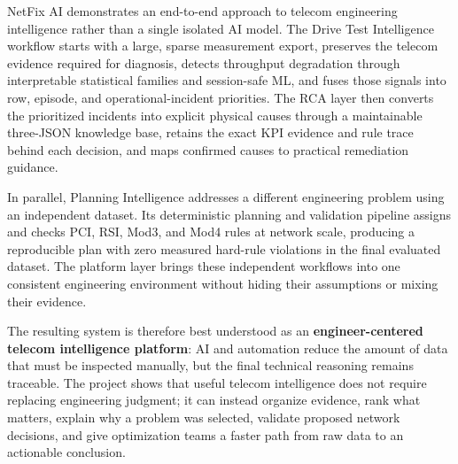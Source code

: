NetFix AI demonstrates an end-to-end approach to telecom engineering intelligence rather than a single isolated AI model. The Drive Test Intelligence workflow starts with a large, sparse measurement export, preserves the telecom evidence required for diagnosis, detects throughput degradation through interpretable statistical families and session-safe ML, and fuses those signals into row, episode, and operational-incident priorities. The RCA layer then converts the prioritized incidents into explicit physical causes through a maintainable three-JSON knowledge base, retains the exact KPI evidence and rule trace behind each decision, and maps confirmed causes to practical remediation guidance.

In parallel, Planning Intelligence addresses a different engineering problem using an independent dataset. Its deterministic planning and validation pipeline assigns and checks PCI, RSI, Mod3, and Mod4 rules at network scale, producing a reproducible plan with zero measured hard-rule violations in the final evaluated dataset. The platform layer brings these independent workflows into one consistent engineering environment without hiding their assumptions or mixing their evidence.

The resulting system is therefore best understood as an \textbf{engineer-centered telecom intelligence platform}: AI and automation reduce the amount of data that must be inspected manually, but the final technical reasoning remains traceable. The project shows that useful telecom intelligence does not require replacing engineering judgment; it can instead organize evidence, rank what matters, explain why a problem was selected, validate proposed network decisions, and give optimization teams a faster path from raw data to an actionable conclusion.

